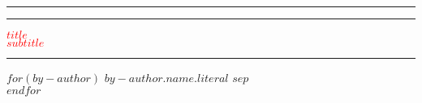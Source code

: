 %
%
%
% 

\thispagestyle{empty} %

\centering %


\rule{\textwidth}{1pt} %

\vspace{2pt}\vspace{-\baselineskip} %

\rule{\textwidth}{0.4pt} %

\vspace{0.1\textheight} %


\textcolor{red}{ %
	{\Huge \uppercase{$title$}}\\[1\baselineskip] %
	{\Large $subtitle$} %
}

\vspace{0.025\textheight} %

\rule{0.3\textwidth}{0.4pt} %

\vspace{0.1\textheight} %


$for(by-author)$%
{\Large \textsc{$by-author.name.literal$}}%
$sep$\\ %
$endfor$%

\vfill %


